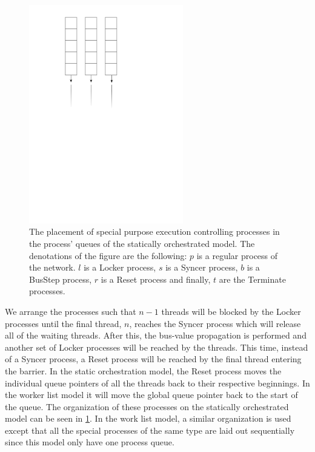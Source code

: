 \begin{figure}
\centering
\includegraphics[width=0.6\textwidth]{figures/orch-model-proc}
\caption[Execution controlling processes]{The placement of special
  purpose execution controlling processes in the process' queues of
  the statically orchestrated model. The denotations of the figure are
  the following: $p$ is a regular process of the network. $l$ is a
  Locker process, $s$ is a Syncer process, $b$ is a BusStep process,
  $r$ is a Reset process and finally, $t$ are the Terminate processes.}
\label{fig:orchproc}
\end{figure}


We arrange the processes such that $n-1$ threads will be blocked by the
Locker processes until the final thread, $n$, reaches the Syncer process which will
release all of the waiting threads. After this, the bus-value
propagation is performed and another set of Locker processes will be
reached by the threads. This time, instead of a Syncer process, a Reset
process will be reached by the final thread entering the barrier. In the static orchestration model, the
Reset process moves the individual queue pointers of all the threads
back to their respective beginnings.
In the worker list model it will move the global queue
pointer back to the start of the queue. The organization of these processes on the statically
orchestrated model can be seen in \cref{fig:orchproc}. In the work
list model, a similar organization is used except that all the special
processes of the same type are laid out sequentially since this model only
have one process queue.


